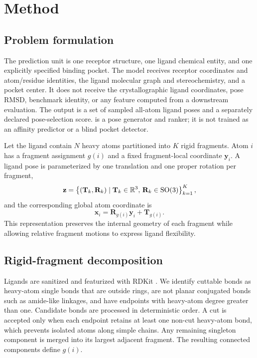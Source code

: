 \section{Method}
\label{sec:method}

\subsection{Problem formulation}

The prediction unit is one receptor structure, one ligand chemical entity, and
one explicitly specified binding pocket. The model receives receptor
coordinates and atom/residue identities, the ligand molecular graph and
stereochemistry, and a pocket center. It does not receive the crystallographic
ligand coordinates, pose RMSD, benchmark identity, or any feature computed
from a downstream evaluation. The output is a set of sampled all-atom ligand
poses and a separately declared pose-selection score. \method is a pose
generator and ranker; it is not trained as an affinity predictor or a blind
pocket detector.

Let the ligand contain \(N\) heavy atoms partitioned into \(K\) rigid
fragments. Atom \(i\) has a fragment assignment \(g(i)\) and a fixed
fragment-local coordinate \(\mathbf{y}_i\). A ligand pose is parameterized by
one translation and one proper rotation per fragment,
\[
    \mathbf{z}
    =
    \left\{(\mathbf{T}_k,\mathbf{R}_k)
    \mid \mathbf{T}_k\in\mathbb{R}^3,\,
    \mathbf{R}_k\in\mathrm{SO}(3)\right\}_{k=1}^{K},
\]
and the corresponding global atom coordinate is
\begin{equation}
    \mathbf{x}_i
    =
    \mathbf{R}_{g(i)}\mathbf{y}_i+\mathbf{T}_{g(i)}.
    \label{eq:atom_reconstruction}
\end{equation}
This representation preserves the internal geometry of each fragment while
allowing relative fragment motions to express ligand flexibility.

\subsection{Rigid-fragment decomposition}
\label{sec:fragmentation}

Ligands are sanitized and featurized with RDKit
\citep{landrum2024rdkit}. We identify cuttable bonds as heavy-atom single
bonds that are outside rings, are not planar conjugated bonds such as
amide-like linkages, and have endpoints with heavy-atom degree greater than
one. Candidate bonds are processed in deterministic order. A cut is accepted
only when each endpoint retains at least one non-cut heavy-atom bond, which
prevents isolated atoms along simple chains. Any remaining singleton component
is merged into its largest adjacent fragment. The resulting connected
components define \(g(i)\).

